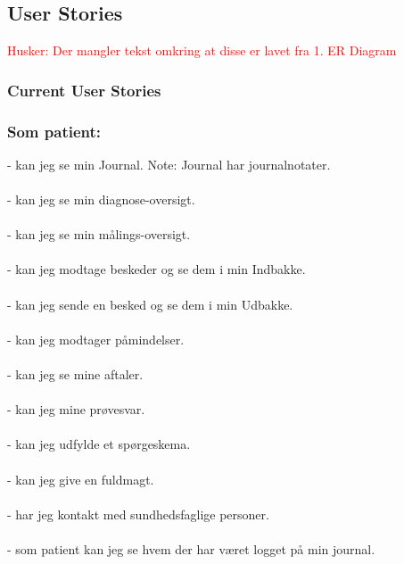 %
%
%
%
%
%
\subsection{User Stories}
\textcolor{red}{Husker: Der mangler tekst omkring at disse er lavet fra 1. ER Diagram}\\
\subsubsection{Current User Stories} %
\subsubsection*{Som patient:}
- kan jeg se min Journal. Note: Journal har journalnotater. \\
\\
- kan jeg se min diagnose-oversigt.\\
\\
- kan jeg se min målings-oversigt.\\
\\
- kan jeg modtage beskeder og se dem i min Indbakke.\\
\\
- kan jeg sende en besked og se dem i min Udbakke.\\
\\
- kan jeg modtager påmindelser.\\
\\
- kan jeg se mine aftaler. \\
\\
- kan jeg mine prøvesvar.\\
\\
- kan jeg udfylde et spørgeskema.\\
\\
- kan jeg give en fuldmagt. \\
\\
- har jeg kontakt med sundhedsfaglige personer. \\
\\
- som patient kan jeg se hvem der har været logget på min journal.
